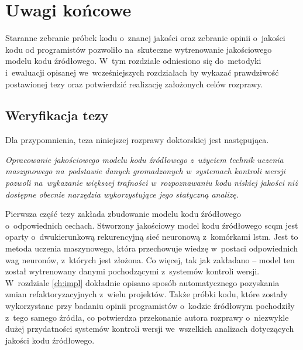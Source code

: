 \documentclass[twoside]{praca}
\begin{document}
\chapter{Uwagi końcowe}
\label{ch:conclusions}


\begin{addmargin}{1cm}
Staranne zebranie próbek kodu o~znanej jakości oraz zebranie opinii o~jakości kodu od programistów pozwoliło na~skuteczne wytrenowanie jakościowego modelu kodu źródłowego. W~tym rozdziale odniesiono się do~metodyki i~ewaluacji opisanej we~wcześniejszych rozdziałach by wykazać prawdziwość postawionej tezy oraz potwierdzić realizację założonych celów rozprawy.
\end{addmargin}

\section{Weryfikacja tezy}
\label{sec:conslusions:thesis}

Dla przypomnienia, teza niniejszej rozprawy doktorskiej jest następująca.

\vspace{5mm}
\begin{addmargin}{1cm}
\textit{Opracowanie jakościowego modelu kodu źródłowego z~użyciem technik uczenia maszynowego na~podstawie danych gromadzonych w~systemach kontroli wersji pozwoli na~wykazanie większej trafności w~rozpoznawaniu kodu niskiej jakości niż dostępne obecnie narzędzia wykorzystujące jego statyczną analizę.}
\end{addmargin}
\vspace{5mm}

Pierwsza część tezy zakłada zbudowanie modelu kodu źródłowego o~odpowiednich cechach. Stworzony jakościowy model kodu źródłowego \gls{scqm} jest oparty o~dwukierunkową rekurencyjną sieć neuronową z~komórkami \gls{lstm}. Jest to metoda uczenia maszynowego, która przechowuje wiedzę w~postaci odpowiednich wag neuronów, z~których jest złożona. Co więcej, tak jak zakładano -- model ten został wytrenowany danymi pochodzącymi z~systemów kontroli wersji. W~rozdziale \ref{ch:impl} dokładnie opisano sposób automatycznego pozyskania zmian refaktoryzacyjnych z~wielu projektów. Także próbki kodu, które zostały wykorzystane przy badaniu opinii programistów o~kodzie źródłowym pochodziły z~tego samego źródła, co potwierdza przekonanie autora rozprawy o~niezwykle dużej przydatności systemów kontroli wersji we~wszelkich analizach dotyczących jakości kodu źródłowego.
\end{document}
